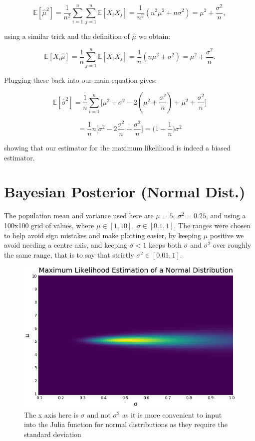 \documentclass[a4paper,12pt,notitlepage]{article}
\begin{document}
$$\mathbb{E}[\hat{\mu}^2] = \frac{1}{n^2} \sum_{i=1}^n \sum_{j=1}^n \mathbb{E}[X_i X_j] = \frac{1}{n^2} (n^2 \mu^2 + n \sigma^2) = \mu^2 + \frac{\sigma^2}{n}, $$

using a similar trick and the definition of $\hat{\mu}$ we obtain:

$$ \mathbb{E}[X_i \hat{\mu}] = \frac{1}{n} \sum_{j=1}^n \mathbb{E}[X_i X_j] = \frac{1}{n} (n\mu^2 + \sigma^2) = \mu^2 + \frac{\sigma^2}{n}.$$

Plugging these back into our main equation gives:

$$ \mathbb{E}[\hat{\sigma}^2] = \frac{1}{n} \sum_{i=1}^n \big[ \mu^2 + \sigma^2 - 2(\mu^2 + \frac{\sigma^2}{n}) + \mu^2 + \frac{\sigma^2}{n}\big]$$

$$ = \frac{1}{n} n \big[ \sigma^2 - 2 \frac{\sigma^2}{n} + \frac{\sigma^2}{n}\big] = \big(1-\frac{1}{n}\big)\sigma^2$$

showing that our estimator for the maximum likelihood is indeed a biased estimator.

\section{Bayesian Posterior (Normal Dist.)}

The population mean and variance used here are $\mu=5 , \  \sigma^2=0.25$, and using a 100x100 grid of values, where $\mu \in [1,10] , \ \sigma \in [0.1,1]$. The ranges were chosen to help avoid sign mistakes and make plotting easier, by keeping $\mu$ positive we avoid needing a centre axis, and keeping $\sigma < 1$ keeps both $\sigma$ and $\sigma^2$ over roughly the same range, that is to say that strictly $\sigma^2 \in [0.01,1]$.

\begin{figure}[h]
\centering
\includegraphics[width=13cm,8cm]{mle_2d.png}
\caption{The x axis here is $\sigma$ and not $\sigma^2$ as it is more convenient to input into the Julia function for normal distributions as they require the standard deviation}
\end{figure}
\end{document}
